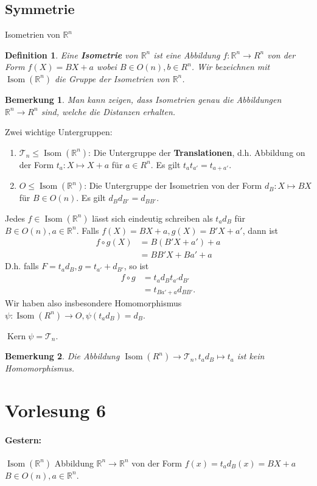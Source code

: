 \documentclass{article}
\theoremstyle{plain}
\newtheorem{definition}{Definition}
\newtheorem{bemerkung}{Bemerkung}
\renewcommand{\ker}{\mathop{\mathrm{Kern}}}
\newcommand{\defn}[1]{\textbf{#1}}
\newcommand{\R}{\mathbb{R}}
\newcommand{\ug}{\leq}
\newcommand{\isom}{\mathop\text{Isom}}
\newcommand{\trans}{\mathcal{T}}
\begin{document}
\subsection*{Symmetrie}
Isometrien von $\R^n$
\begin{definition}
    Eine \defn{Isometrie} von $\R^n$ ist eine Abbildung $f\colon\R^n\to R^n$ von der Form $f(X)=BX+a$ wobei $B\in O(n), b\in R^n$. Wir bezeichnen mit $\isom(\R^n)$ die Gruppe der Isometrien von $\R^n$.
\end{definition}
\begin{bemerkung}
    Man kann zeigen, dass Isometrien genau die Abbildungen $\R^n\to R^n$ sind, welche die Distanzen erhalten.
\end{bemerkung}
Zwei wichtige Untergruppen: 
\begin{enumerate}[label=(\arabic*)]
    \item $\trans_n\ug\isom(\R^n)$: Die Untergruppe der \defn{Translationen}, d.h. Abbildung on der Form $t_a\colon X\mapsto X + a$ für $a\in R^n$. Es gilt $t_at_{a'}=t_{a+a'}$.
    \item $O \ug \isom(\R^n)$: Die Untergruppe der Isometrien von der Form $d_B\colon X\mapsto BX$ für $B\in O(n)$. Es gilt $d_Bd_{B'}=d_{BB'}$.
\end{enumerate}
Jedes $f\in \isom(\R^n)$ lässt sich eindeutig schreiben als $t_ad_B$ für $B\in O(n), a\in \R^n$.
Falls $f(X)=BX+a, g(X)=B'X+a'$, dann ist \begin{align*}
    f\circ g(X)&=B(B'X+a')+a\\
    &= BB'X + Ba'+a
\end{align*}
D.h. falls $F=t_ad_B, g=t_{a'}+d_{B'}$, so ist 
\begin{align*}
    f\circ g&=t_ad_Bt_{a'}d_{B'}\\
    &=t_{Ba'+a}d_{BB'}.
\end{align*}
Wir haben also insbesondere Homomorphismus $\psi \colon\isom(R^n)\to O, \psi(t_ad_B)=d_B$.

$\ker\psi=\trans_n$.
\begin{bemerkung}
    Die Abbildung $\isom(R^n)\to\trans_n, t_ad_B\mapsto t_a$ ist kein Homomorphismus.
\end{bemerkung}

\section*{Vorlesung 6}

\paragraph{Gestern:} $\isom(\R^n)$
Abbildung $\R^n\to\R^n$ von der Form $f(x)=t_ad_B(x)=BX+a$
$B\in O(n), a\in \R^n$.
\end{document}

